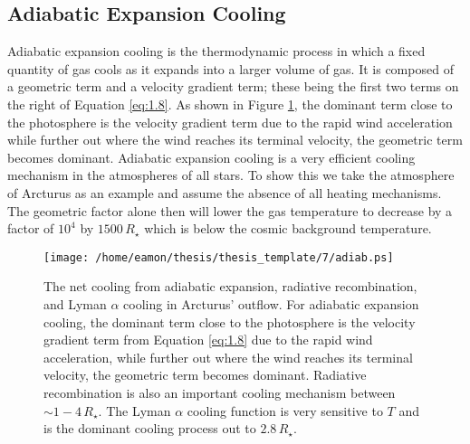 \subsection{Adiabatic Expansion Cooling}\label{sec:3.1}
Adiabatic expansion cooling is the thermodynamic process in which a fixed quantity of gas cools as it expands into a larger volume of gas. It is composed of a geometric term and a velocity gradient term; these being the first two terms on the right of Equation \ref{eq:1.8}. As shown in Figure \ref{fig:7.1}, the dominant term close to the photosphere is the velocity gradient term due to the rapid wind acceleration while further out where the wind reaches its terminal velocity, the geometric term becomes dominant. Adiabatic expansion cooling is a very efficient cooling mechanism in the atmospheres of all stars. To show this we take the atmosphere of Arcturus as an example and assume the absence of all heating mechanisms. The geometric factor alone then will lower the gas temperature to decrease by a factor of $10^4$ by $1500\,R_{\star}$ which is below the cosmic background temperature. 

\begin{figure}[!ht]
\centering 
         \texttt{[image: /home/eamon/thesis/thesis\_template/7/adiab.ps]}
\caption[]{The net cooling from adiabatic expansion, radiative recombination, and Lyman $\alpha$ cooling in Arcturus' outflow. For adiabatic expansion cooling, the dominant term close to the photosphere is the velocity gradient term from Equation \ref{eq:1.8} due to the rapid wind acceleration, while further out where the wind reaches its terminal velocity, the geometric term becomes dominant. Radiative recombination is also an important cooling mechanism between $\sim 1-4\,R_{\star}$. The Lyman $\alpha$ cooling function is very sensitive to $T$ and is the dominant cooling process out to $2.8\,R_{\star}$.}
\label{fig:7.1}
\end{figure}

